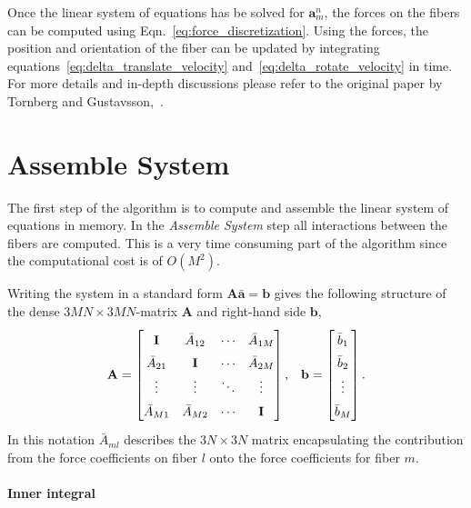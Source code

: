 Once the linear system of equations has be solved for $\mathbf{a}_m^n$, the forces on the fibers can be computed using Eqn.~\eqref{eq:force_discretization}. Using the forces, the position and orientation of the fiber can be updated by integrating equations~\eqref{eq:delta_translate_velocity} and~\eqref{eq:delta_rotate_velocity} in 
time. For more details and in-depth discussions please refer to the original paper by Tornberg and Gustavsson,~\cite{Tornberg2006}.

\section{Assemble System}

The first step of the algorithm is to compute and assemble the linear system of equations in memory. In the \emph{Assemble System} step all interactions between the fibers are computed. This is a very time consuming part of the algorithm since the computational cost is of $O(M^2)$.

Writing the system in a standard form $\mathbf{A}\mathbf{\bar{a}}=\mathbf{b}$ gives the following structure of the dense $3MN\times3MN$-matrix $\mathbf{A}$ and right-hand side $\mathbf{b}$,
\begin{equation}
  \label{eq:matrix_structure}
  \renewcommand\arraystretch{1.5}
  \mathbf{A} =
  \begin{bmatrix}
    \mathbf{I} & \bar{A}_{12} & \cdots & \bar{A}_{1M} \\
    \bar{A}_{21} & \mathbf{I} & \cdots & \bar{A}_{2M} \\
    \vdots & \vdots & \ddots & \vdots \\
    \bar{A}_{M1} & \bar{A}_{M2} & \cdots & \mathbf{I}
  \end{bmatrix} \text{,} \quad \mathbf{b} =
  \begin{bmatrix}
    \bar{b}_{1} \\
    \bar{b}_{2} \\
    \vdots \\
    \bar{b}_{M} \\
  \end{bmatrix} \text{.}
\end{equation}
In this notation $\bar{A}_{ml}$ describes the $3N\times3N$ matrix encapsulating the contribution from the force coefficients on fiber $l$ onto the force coefficients for fiber $m$.

\pagebreak
\paragraph{Inner integral}

